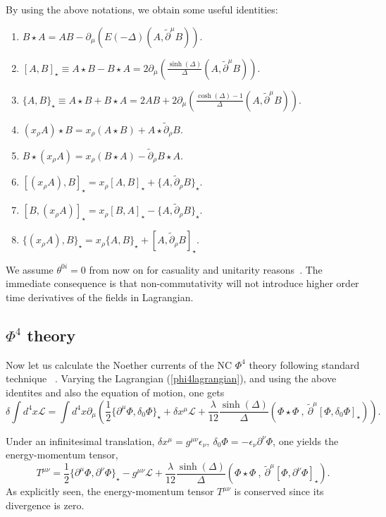 \documentclass[a4paper,a4paper]{article}
\begin{document}
By using the above notations, we obtain some useful identities:
\begin{enumerate}
\item $B\star A  =  AB - \partial_\mu\left(E(-\Delta)(A,\tilde{\partial}^\mu B)\right).$
\item $[A,B]_{\star}  \equiv A\star B - B\star A = 2\partial_\mu\left(\frac{\sinh(\Delta)}{\Delta}(A,\tilde{\partial}^\mu B)\right).$
\item $\{A,B\}_{\star}  \equiv  A\star B + B\star A = 2AB + 2\partial_\mu\left(\frac{\cosh(\Delta)-1}{\Delta}(A,\tilde{\partial}^\mu B)\right).$
\item $(x_\rho A)\star B = x_\rho(A\star B) + A\star \tilde{\partial}_\rho B.$
\item $B\star (x_\rho A) = x_\rho(B\star A) - \tilde{\partial}_\rho B\star A.$
\item $[(x_\rho A),B]_\star =x_\rho[A,B]_\star + \{A,\tilde{\partial}_\rho B\}_\star.$
\item $[B,(x_\rho A)]_\star =x_\rho[B,A]_\star - \{A,\tilde{\partial}_\rho B\}_\star.$
\item $\{(x_\rho A),B\}_\star =x_\rho\{A,B\}_\star + [A,\tilde{\partial}_\rho B]_\star.$
\end{enumerate}

We assume $\theta^{0i} =0$ from now on for casuality and unitarity reasons~\cite{gomis}. The immediate
consequence is that non-commutativity will not introduce higher order time derivatives of
the fields in Lagrangian. 

\subsection{$\Phi^4$ theory}
Now let us calculate the Noether currents of 
the NC $\Phi^4$ theory following standard technique~\cite{Ramond} . Varying 
the Lagrangian (\ref{phi4lagrangian}), 
and using the above identites and also the equation of motion, one gets
\begin{equation}
\delta \int d^4x \mathcal{L}=\int d^4x
\partial_\mu\left(\frac 12 \{\partial^\mu\Phi,\delta_0\Phi\}_\star+\delta x^\mu\mathcal{L}
+\frac{\lambda}{12}\frac{\sinh(\Delta)}{\Delta}
(\Phi\star \Phi~,~\tilde{\partial}^\mu[\Phi,\delta_0\Phi]_\star)\right).
\end{equation}

Under an infinitesimal translation, $\delta x^\mu = g^{\mu\nu}\epsilon_\nu,
~\delta_0 \Phi = -\epsilon_\nu \partial^\nu \Phi$, one yields the energy-momentum tensor,
\begin{equation}
T^{\mu\nu} = \frac 12 \{\partial^\mu\Phi,\partial^\nu\Phi\}_\star - g^{\mu\nu}\mathcal{L}
+\frac{\lambda}{12}\frac{\sinh(\Delta)}{\Delta}
(\Phi\star \Phi~,~\tilde{\partial}^\mu[\Phi,\partial^\nu\Phi]_\star).
\label{energy-momentum-tensor}
\end{equation}
As explicitly seen, the energy-momentum tensor $T^{\mu\nu}$ is conserved 
since its divergence is zero. 
  
\end{document}
